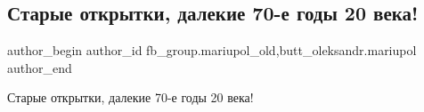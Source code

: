  
 
 
 
 

\subsection{Старые открытки, далекие 70-е годы 20 века!}
\label{sec:28_03_2023.fb.fb_group.mariupol_old.1.starie_otkritki__dal}
 
\ifcmt
 author_begin
   author_id fb_group.mariupol_old,butt_oleksandr.mariupol
 author_end
\fi

Старые открытки, далекие 70-е годы 20 века! 💐

